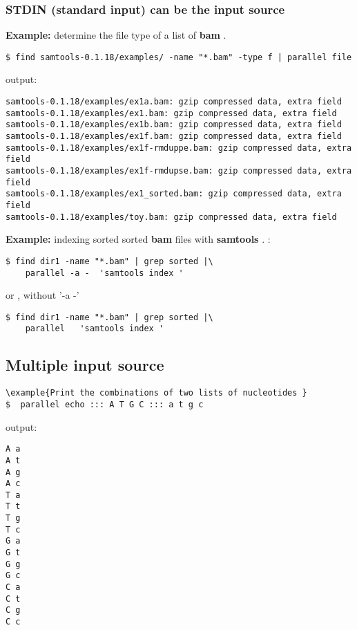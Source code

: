 \documentclass{article}
\newcommand{\example}[1]{
\textbf{Example: } {\color[rgb]{0,0,1} #1 } .
}
\def\bam{\textbf{bam}}
\def\samtools{\textbf{samtools}}
\begin{document}
\subsubsection{STDIN (standard input) can be the input source}
\example{determine the file type of a list of \bam{}}
\begin{lstlisting}
$ find samtools-0.1.18/examples/ -name "*.bam" -type f | parallel file
\end{lstlisting}
output:
\begin{lstlisting}
samtools-0.1.18/examples/ex1a.bam: gzip compressed data, extra field
samtools-0.1.18/examples/ex1.bam: gzip compressed data, extra field
samtools-0.1.18/examples/ex1b.bam: gzip compressed data, extra field
samtools-0.1.18/examples/ex1f.bam: gzip compressed data, extra field
samtools-0.1.18/examples/ex1f-rmduppe.bam: gzip compressed data, extra field
samtools-0.1.18/examples/ex1f-rmdupse.bam: gzip compressed data, extra field
samtools-0.1.18/examples/ex1_sorted.bam: gzip compressed data, extra field
samtools-0.1.18/examples/toy.bam: gzip compressed data, extra field
\end{lstlisting}


\example{indexing sorted sorted \bam{} files with \samtools{}}:
\begin{lstlisting}
$ find dir1 -name "*.bam" | grep sorted |\
	parallel -a -  'samtools index '
\end{lstlisting}
or , without '-a -'
\begin{lstlisting}
$ find dir1 -name "*.bam" | grep sorted |\
	parallel   'samtools index '
\end{lstlisting}

\subsection{Multiple input source}


\begin{lstlisting}
\example{Print the combinations of two lists of nucleotides }
$  parallel echo ::: A T G C ::: a t g c
\end{lstlisting}
output:
\begin{lstlisting}
A a
A t
A g
A c
T a
T t
T g
T c
G a
G t
G g
G c
C a
C t
C g
C c
\end{lstlisting}
\end{document}
